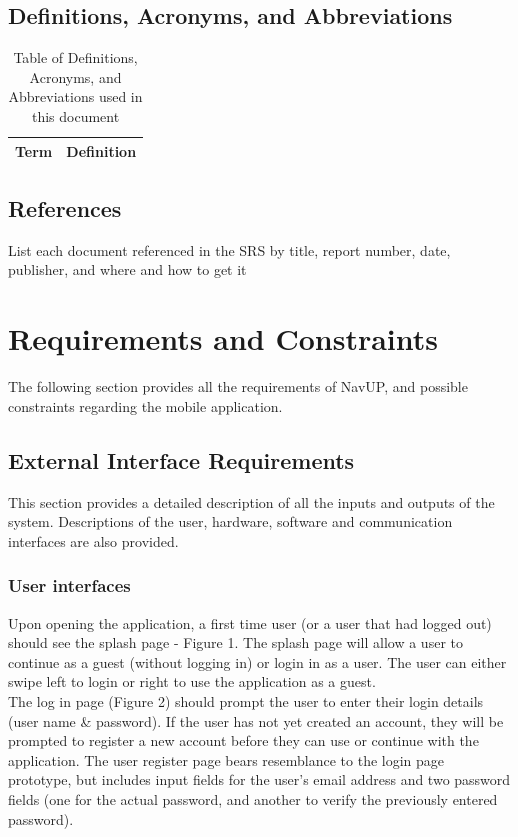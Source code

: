 \documentclass{article}
\begin{document}
		\subsection{Definitions, Acronyms, and Abbreviations}\label{subsec:daa}
			\begin{table}[h!]
				\centering
				\caption{Table of Definitions, Acronyms, and Abbreviations used in this document}
				\label{tab: Table 1}
				\begin{tabular}{| m{4cm} | m{12cm} |}
					\hline
					\textbf{Term} & \textbf{Definition} \\
					\hline
					\hline
					
				\end{tabular}
			\end{table}
	
		\subsection{References}\label{subsec:references}
		List each document referenced in the SRS by title, report number, date, publisher, and where and how to get it
		
	\section{Requirements and Constraints}\label{sec:requirements}
	The following section provides all the requirements of NavUP, and possible constraints regarding the mobile application.
			\subsection{External Interface Requirements}\label{subsec:external}
			This section provides a detailed description of all the inputs and outputs of the system. Descriptions of the user, hardware, software and communication interfaces are also provided.
			\subsubsection{User interfaces}
			Upon opening the application, a first time user (or a user that had logged out) should see the splash page - Figure 1. The splash page will allow a user to continue as a guest (without logging in) or login in as a user. The user can either swipe left to login or right to use the application as a guest. \\
			
			The log in page (Figure 2) should prompt the user to enter their login details (user name \& password). If the user has not yet created an account, they will be prompted to register a new account before they can use or continue with the application. The user register page bears resemblance to the login page prototype, but includes input fields for the user's email address and two password fields (one for the actual password, and another to verify the previously entered password). \\
			
\end{document}
